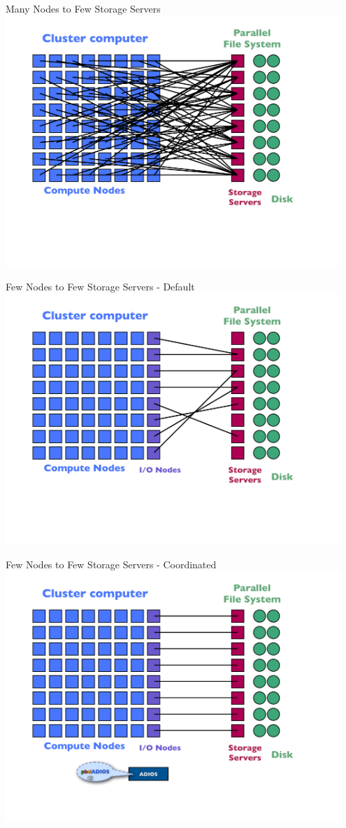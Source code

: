 \begin{frame}{Many Nodes to Few Storage Servers}
    \centering
    \includegraphics[width=0.95\textwidth]{../common/pics/hardware/ParallelHardware18.pdf}
\end{frame}

\begin{frame}{Few Nodes to Few Storage Servers - Default}
    \centering
    \includegraphics[width=0.95\textwidth]{../common/pics/hardware/ParallelHardware19.pdf}
\end{frame}

\begin{frame}{Few Nodes to Few Storage Servers - Coordinated}
    \centering
    \includegraphics[width=0.95\textwidth]{../common/pics/hardware/ParallelHardware20.pdf}
\end{frame}

